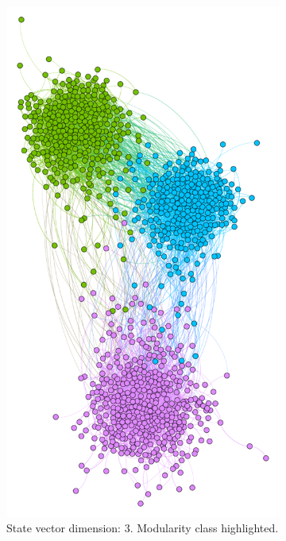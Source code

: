 \begin{figure}
  \centering
  \begin{subfigure}[t]{0.25\textwidth}
    \includegraphics[width=\textwidth]{img/dim3_mod.pdf}
    \caption{State vector dimension: 3.
      Modularity class highlighted.}
    \label{fig:bubble3mod}
  \end{subfigure}
  ~
  \begin{subfigure}[t]{0.35\textwidth}

\end{subfigure}
\end{figure}
